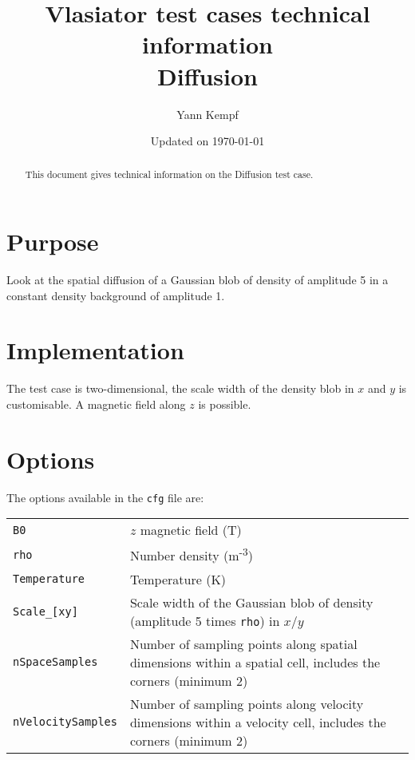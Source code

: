 \documentclass[a4paper,10pt]{scrartcl}
\title{
\Huge{Vlasiator test cases technical information} \\
\LARGE{Diffusion}
}
\author{Yann Kempf}
\date{Updated on \today}
\begin{document}
\maketitle

\begin{abstract}
   This document gives technical information on the Diffusion test case.
\end{abstract}

\section{Purpose}
Look at the spatial diffusion of a Gaussian blob of density of amplitude 5 in a constant density background of amplitude 1.

\section{Implementation}
The test case is two-dimensional, the scale width of the density blob in $x$ and $y$ is customisable. A magnetic field along $z$ is possible.

\section{Options}
The options available in the \verb=cfg= file are:

\begin{tabularx}{\textwidth}{lX}
   \verb=B0= & $z$ magnetic field (T) \\
   \verb=rho= & Number density (m\textsuperscript{-3}) \\
   \verb=Temperature= & Temperature (K) \\
   \verb=Scale_[xy]= & Scale width of the Gaussian blob of density (amplitude 5 times \verb=rho=) in $x$/$y$ \\
   \verb=nSpaceSamples= & Number of sampling points along spatial dimensions within a spatial cell, includes the corners (minimum 2) \\
   \verb=nVelocitySamples= & Number of sampling points along velocity dimensions within a velocity cell, includes the corners (minimum 2)
\end{tabularx}
\end{document}
